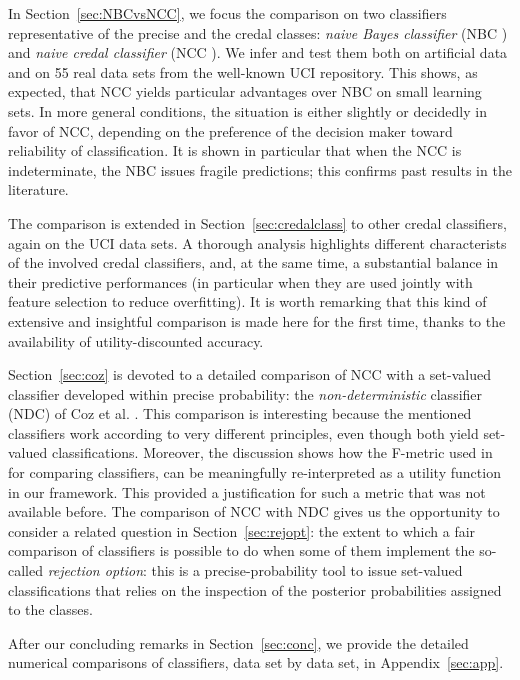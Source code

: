 \documentclass[a4paper,10pt,reqno]{amsart}
\theoremstyle{remark}
\begin{document}
In Section~\ref{sec:NBCvsNCC}, we focus the comparison on two classifiers representative of the precise and the credal classes: \emph{naive Bayes classifier} (NBC \cite{domingos1997}) and \emph{naive credal classifier} (NCC \cite{zaffalon1999a,zaffalon2001a,corani2008a}). We infer and test them both on artificial data and on 55 real data sets from the well-known UCI repository. This shows, as expected, that NCC yields particular advantages over NBC on small learning sets. In more general conditions, the situation is either slightly or decidedly in favor of NCC, depending on the preference of the decision maker toward reliability of classification. It is shown in particular that when the NCC is indeterminate, the NBC issues fragile predictions; this confirms past results in the literature.

The comparison is extended in Section~\ref{sec:credalclass} to other credal classifiers, again on the UCI data sets. A thorough analysis highlights different characterists of the involved credal classifiers, and, at the same time, a substantial balance in their predictive performances (in particular when they are used jointly with feature selection to reduce overfitting). It is worth remarking that this kind of extensive and insightful comparison is made here for the first time, thanks to the availability of utility-discounted accuracy.

Section~\ref{sec:coz} is devoted to a detailed comparison of NCC with a set-valued classifier developed within precise probability: the \emph{non-deterministic} classifier (NDC) of Coz et al. \cite{JdalCozlearning}. This comparison is interesting because the mentioned classifiers work according to very different principles, even though both yield set-valued classifications. Moreover, the discussion shows how the F-metric used in \cite{JdalCozlearning} for comparing classifiers, can be meaningfully re-interpreted as a utility function in our framework. This provided a justification for such a metric that was not available before. The comparison of NCC with NDC gives us the opportunity to consider a related question in Section~\ref{sec:rejopt}: the extent to which a fair comparison of classifiers is possible to do when some of them implement the so-called \emph{rejection option}: this is a precise-probability tool to issue set-valued classifications that relies on the inspection of the posterior probabilities assigned to the classes.

After our concluding remarks in Section~\ref{sec:conc}, we provide the detailed numerical comparisons of classifiers, data set by data set, in Appendix~\ref{sec:app}.
\end{document}
